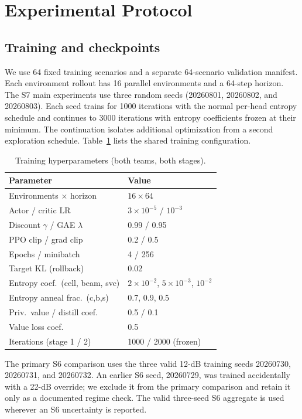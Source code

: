 \section{Experimental Protocol}
\subsection{Training and checkpoints}
We use 64 fixed training scenarios and a separate 64-scenario validation manifest. Each environment rollout has 16 parallel environments and a 64-step horizon. The S7 main experiments use three random seeds (20260801, 20260802, and 20260803). Each seed trains for 1000 iterations with the normal per-head entropy schedule and continues to 3000 iterations with entropy coefficients frozen at their minimum. The continuation isolates additional optimization from a second exploration schedule. Table~\ref{tab:hyper} lists the shared training configuration.

\begin{table}[t]
\caption{Training hyperparameters (both teams, both stages).}
\label{tab:hyper}
\centering
\footnotesize
\setlength{\tabcolsep}{4pt}
\begin{tabular}{ll}
\toprule
Parameter & Value \\
\midrule
Environments $\times$ horizon & $16\times64$ \\
Actor / critic LR & $3\times10^{-5}$ / $10^{-3}$ \\
Discount $\gamma$ / GAE $\lambda$ & 0.99 / 0.95 \\
PPO clip / grad clip & 0.2 / 0.5 \\
Epochs / minibatch & 4 / 256 \\
Target KL (rollback) & 0.02 \\
Entropy coef.\ (cell, beam, svc) & $2{\times}10^{-2}$, $5{\times}10^{-3}$, $10^{-2}$ \\
Entropy anneal frac.\ (c,b,s) & 0.7, 0.9, 0.5 \\
Priv.\ value / distill coef. & 0.5 / 0.1 \\
Value loss coef. & 0.5 \\
Iterations (stage 1 / 2) & 1000 / 2000 (frozen) \\
\bottomrule
\end{tabular}
\end{table}

The primary S6 comparison uses the three valid 12-dB training seeds 20260730, 20260731, and 20260732. An earlier S6 seed, 20260729, was trained accidentally with a 22-dB override; we exclude it from the primary comparison and retain it only as a documented regime check. The valid three-seed S6 aggregate is used wherever an S6 uncertainty is reported.

